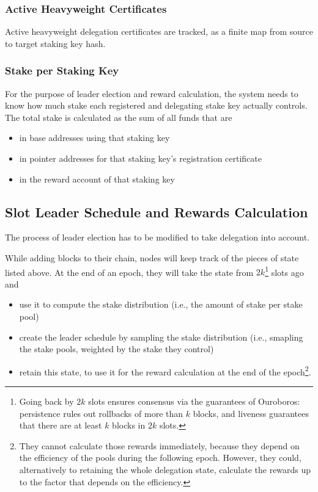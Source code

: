 \documentclass[11pt,a4paper]{article}
\begin{document}
\subsubsection{Active Heavyweight Certificates}
\label{active-heavyweight-certificates}

Active heavyweight delegation certificates are tracked, as a finite
map from source to target staking key hash.

\subsubsection{Stake per Staking Key}
\label{stake-per-staking-key}

For the purpose of leader election and reward calculation, the system
needs to know how much stake each registered and delegating stake key
actually controls. The total stake is calculated as the sum of all
funds that are
\begin{itemize}
\item in base addresses using that staking key
\item in pointer addresses for that staking key's registration
  certificate
\item in the reward account of that staking key
\end{itemize}

\subsection{Slot Leader Schedule and Rewards Calculation}
\label{slot-leader-schedule}

The process of leader election has to be modified to take delegation
into account.

While adding blocks to their chain, nodes will keep track of the
pieces of state listed above. At the end of an epoch, they will take
the state from \(2k\)\footnote{Going back by \(2k\) slots ensures
  consensus via the guarantees of Ouroboros: persistence rules out
  rollbacks of more than \(k\) blocks, and liveness guarantees that
  there are at least \(k\) blocks in \(2k\) slots.} slots ago and
\begin{itemize}
\item use it to compute the stake distribution (i.e., the amount of
  stake per stake pool)
\item create the leader schedule by sampling the stake distribution
  (i.e., smapling the stake pools, weighted by the stake they control)
\item retain this state, to use it for the reward calculation at the
  end of the epoch\footnote{They cannot calculate those rewards
    immediately, because they depend on the efficiency of the pools
    during the following epoch. However, they could, alternatively to
    retaining the whole delegation state, calculate the rewards up to
    the factor that depends on the efficiency.}.
\end{itemize}
\end{document}
